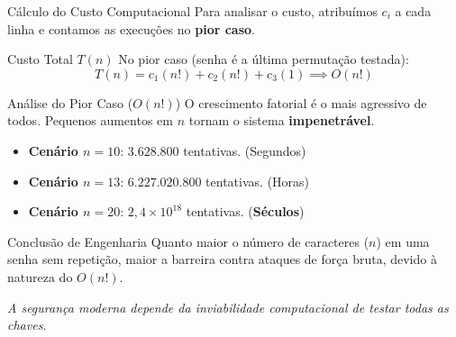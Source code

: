 \documentclass[9pt]{beamer}
\begin{document}
\begin{frame}{Cálculo do Custo Computacional}
    Para analisar o custo, atribuímos $c_i$ a cada linha e contamos as execuções no \textbf{pior caso}.
    \vspace{0.1cm}
    \begin{center}
    \end{center}
    \begin{block}{Custo Total $T(n)$}
        No pior caso (senha é a última permutação testada):
        \[ T(n) = c_1(n!) + c_2(n!) + c_3(1) \implies O(n!) \]
    \end{block}

\end{frame}

\begin{frame}{Análise do Pior Caso ($O(n!)$)}
    O crescimento fatorial é o mais agressivo de todos. Pequenos aumentos em $n$ tornam o sistema \textbf{impenetrável}.
    \vspace{0.2cm}
    \begin{itemize}
        \item \textbf{Cenário $n=10$}: $3.628.800$ tentativas. (Segundos)
        \item \textbf{Cenário $n=13$}: $6.227.020.800$ tentativas. (Horas)
        \item \textbf{Cenário $n=20$}: $2,4 \times 10^{18}$ tentativas. (\textbf{Séculos})
    \end{itemize}
    \vspace{0.3cm}
    \begin{alertblock}{Conclusão de Engenharia}
        Quanto maior o número de caracteres ($n$) em uma senha sem repetição, maior a barreira contra ataques de força bruta, devido à natureza do $O(n!)$.
    \end{alertblock}
    \begin{center}
        \textit{A segurança moderna depende da inviabilidade computacional de testar todas as chaves.}
    \end{center}
\end{frame}
\end{document}
